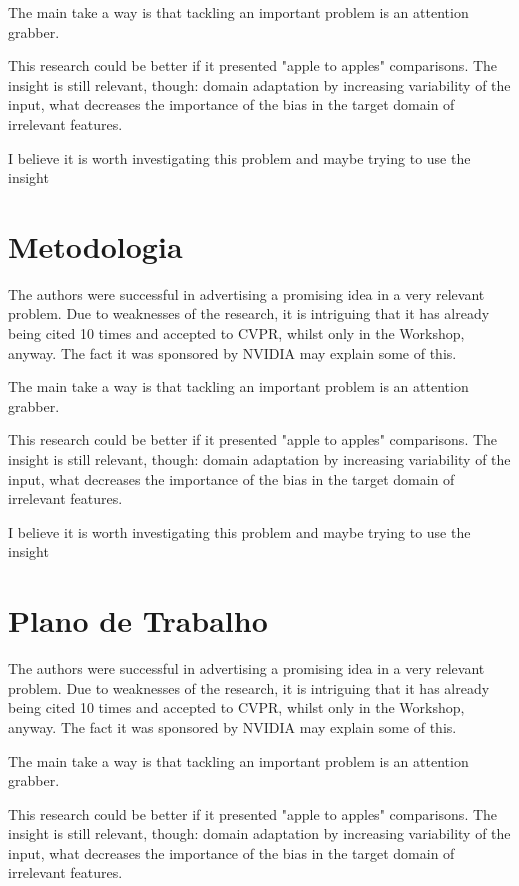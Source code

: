 \documentclass[
12pt, %
a4paper, %
onecolumn, %
]{article}
\begin{document}
The main take a way is that tackling an important problem is an attention grabber. 

This research could be better if it presented "apple to apples" comparisons. The insight is still relevant, though: domain adaptation by increasing variability of the input, what decreases the importance of the bias in the target domain of irrelevant features.

I believe it is worth investigating this problem and maybe trying to use the insight


\section{Metodologia}

The authors were successful in advertising a promising idea in a very relevant problem.  Due to weaknesses of the research, it is intriguing that it has already being cited 10 times and accepted to CVPR, whilst only in the Workshop, anyway. The fact it was sponsored by NVIDIA may explain some of this.

The main take a way is that tackling an important problem is an attention grabber. 

This research could be better if it presented "apple to apples" comparisons. The insight is still relevant, though: domain adaptation by increasing variability of the input, what decreases the importance of the bias in the target domain of irrelevant features.

I believe it is worth investigating this problem and maybe trying to use the insight


\section{Plano de Trabalho}

The authors were successful in advertising a promising idea in a very relevant problem.  Due to weaknesses of the research, it is intriguing that it has already being cited 10 times and accepted to CVPR, whilst only in the Workshop, anyway. The fact it was sponsored by NVIDIA may explain some of this.

The main take a way is that tackling an important problem is an attention grabber. 

This research could be better if it presented "apple to apples" comparisons. The insight is still relevant, though: domain adaptation by increasing variability of the input, what decreases the importance of the bias in the target domain of irrelevant features.
\end{document}
